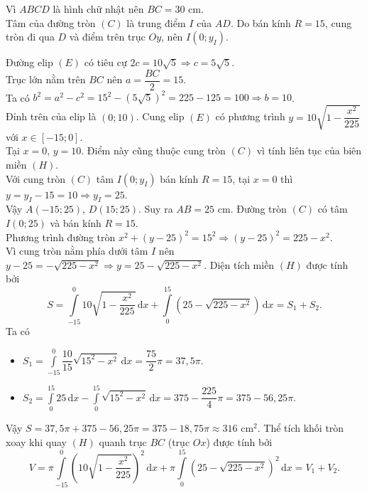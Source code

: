 \begin{ex}
{		Vì $ABCD$ là hình chữ nhật nên $BC = 30$ cm.\\
		Tâm của đường tròn $(C)$ là trung điểm $I$ của $AD$. Do bán kính $R=15$, cung tròn đi qua $D$ và điểm trên trục $Oy$, nên $I(0; y_I)$.
		\begin{itemchoice}
			\itemch Đường elip $(E)$ có tiêu cự $2c = 10\sqrt{5} \Rightarrow c = 5\sqrt{5}$. \\
			Trục lớn nằm trên $BC$ nên $a = \dfrac{BC}{2} = 15$.\\
			Ta có $b^2 = a^2 - c^2 = 15^2 - (5\sqrt{5})^2 = 225 - 125 = 100 \Rightarrow b = 10$.\\
			Đỉnh trên của elip là $(0;10)$. Cung elip $(E)$ có phương trình $y = 10\sqrt{1 - \dfrac{x^2}{225}}$ với $x \in [-15; 0]$.\\
			Tại $x=0$, $y=10$. Điểm này cũng thuộc cung tròn $(C)$ vì tính liên tục của biên miền $(H)$.\\
			Với cung tròn $(C)$ tâm $I(0; y_I)$ bán kính $R=15$, tại $x=0$ thì $y = y_I - 15 = 10 \Rightarrow y_I = 25$.\\
			Vậy $A(-15; 25)$, $D(15; 25)$. Suy ra $AB = 25$ cm.
			\itemch Đường tròn $(C)$ có tâm $I(0;25)$ và bán kính $R=15$.\\
			Phương trình đường tròn $x^2 + (y-25)^2 = 15^2 \Rightarrow (y-25)^2 = 225 - x^2$.\\
			Vì cung tròn nằm phía dưới tâm $I$ nên $y - 25 = -\sqrt{225 - x^2} \Rightarrow y = 25 - \sqrt{225 - x^2}$.
			\itemch Diện tích miền $(H)$ được tính bởi
			\[S = \displaystyle\int\limits_{-15}^{0} 10\sqrt{1 - \dfrac{x^2}{225}}\mathrm{\,d}x + \displaystyle\int\limits_{0}^{15} \left( 25 - \sqrt{225 - x^2} \right)\mathrm{\,d}x = S_1 + S_2.\]
			Ta có
			\begin{itemize}
				\item $S_1 = \displaystyle\int\limits_{-15}^{0} \dfrac{10}{15}\sqrt{15^2 - x^2}\mathrm{\,d}x = \dfrac{75}{2} \pi = 37{,}5\pi$.
				\item $S_2 = \displaystyle\int\limits_{0}^{15} 25\mathrm{\,d}x - \displaystyle\int\limits_{0}^{15} \sqrt{15^2 - x^2}\mathrm{\,d}x = 375 - \dfrac{225}{4} \pi = 375 - 56{,}25\pi$.
			\end{itemize}
			Vậy $S = 37{,}5\pi + 375 - 56{,}25\pi = 375 - 18{,}75\pi \approx 316$ cm$^2$.
			\itemch Thể tích khối tròn xoay khi quay $(H)$ quanh trục $BC$ (trục $Ox$) được tính bởi
			\[V = \pi \displaystyle\int\limits_{-15}^{0} \left( 10\sqrt{1 - \dfrac{x^2}{225}} \right)^2\mathrm{\,d}x + \pi \displaystyle\int\limits_{0}^{15} \left( 25 - \sqrt{225 - x^2} \right)^2\mathrm{\,d}x = V_1 + V_2.\]

\end{itemchoice}}
\end{ex}
